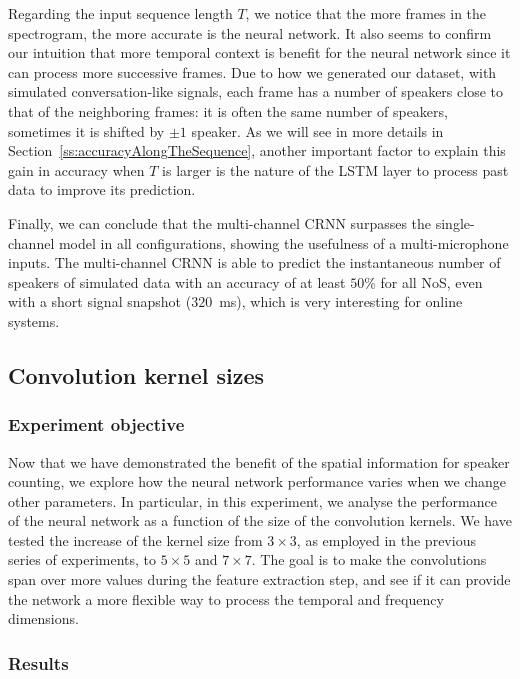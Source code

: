 Regarding the input sequence length $T$, we notice that the more frames in the spectrogram, the more accurate is the neural network. It also seems to confirm our intuition that more temporal context is benefit for the neural network since it can process more successive frames. Due to how we generated our dataset, with simulated conversation-like signals, each frame has a number of speakers close to that of the neighboring frames: it is often the same number of speakers, sometimes it is shifted by $\pm 1$ speaker. As we will see in more details in Section~\ref{ss:accuracyAlongTheSequence}, another important factor to explain this gain in accuracy when $T$ is larger is the nature of the LSTM layer to process past data to improve its prediction. 

Finally, we can conclude that the multi-channel CRNN surpasses the single-channel model in all configurations, showing the usefulness of a multi-microphone inputs. The multi-channel CRNN is able to predict the instantaneous number of speakers of simulated data with an accuracy of at least $50$\% for all NoS, even with a short signal snapshot ($320$~ms), which is very interesting for online systems.

\subsection{Convolution kernel sizes}
\label{ss:countingConvolutionExperiment}
\subsubsection{Experiment objective}

Now that we have demonstrated the benefit of the spatial information for speaker counting, we explore how the neural network performance varies when we change other parameters. In particular, in this experiment, we analyse the performance of the neural network as a function of the size of the convolution kernels. We have tested the increase of the kernel size from $3 \times 3$, as employed in the previous series of experiments, to $5 \times 5$ and $7 \times 7$. The goal is to make the convolutions span over more values during the feature extraction step, and see if it can provide the network a more flexible way to process the temporal and frequency dimensions.

\subsubsection{Results}

